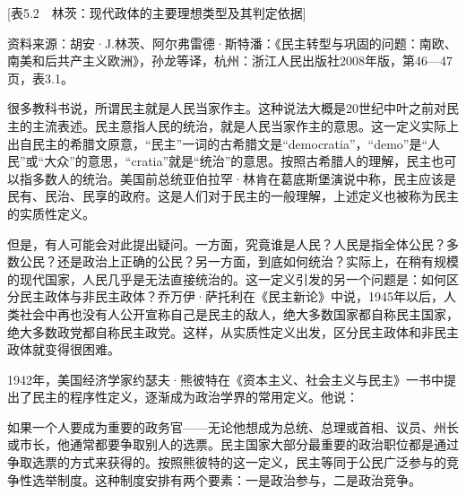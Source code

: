 [表5.2　林茨：现代政体的主要理想类型及其判定依据]



资料来源：胡安·J.林茨、阿尔弗雷德·斯特潘：《民主转型与巩固的问题：南欧、南美和后共产主义欧洲》，孙龙等译，杭州：浙江人民出版社2008年版，第46—47页，表3.1。


很多教科书说，所谓民主就是人民当家作主。这种说法大概是20世纪中叶之前对民主的主流表述。民主意指人民的统治，就是人民当家作主的意思。这一定义实际上出自民主的希腊文原意，“民主”一词的古希腊文是“democratia”，“demo”是“人民”或“大众”的意思，“cratia”就是“统治”的意思。按照古希腊人的理解，民主也可以指多数人的统治。美国前总统亚伯拉罕·林肯在葛底斯堡演说中称，民主应该是民有、民治、民享的政府。这是人们对于民主的一般理解，上述定义也被称为民主的实质性定义。

但是，有人可能会对此提出疑问。一方面，究竟谁是人民？人民是指全体公民？多数公民？还是政治上正确的公民？另一方面，到底如何统治？实际上，在稍有规模的现代国家，人民几乎是无法直接统治的。这一定义引发的另一个问题是：如何区分民主政体与非民主政体？乔万伊·萨托利在《民主新论》中说，1945年以后，人类社会中再也没有人公开宣称自己是民主的敌人，绝大多数国家都自称民主国家，绝大多数政党都自称民主政党。这样，从实质性定义出发，区分民主政体和非民主政体就变得很困难。

1942年，美国经济学家约瑟夫·熊彼特在《资本主义、社会主义与民主》一书中提出了民主的程序性定义，逐渐成为政治学界的常用定义。他说：


如果一个人要成为重要的政务官——无论他想成为总统、总理或首相、议员、州长或市长，他通常都要争取别人的选票。民主国家大部分最重要的政治职位都是通过争取选票的方式来获得的。按照熊彼特的这一定义，民主等同于公民广泛参与的竞争性选举制度。这种制度安排有两个要素：一是政治参与，二是政治竞争。

